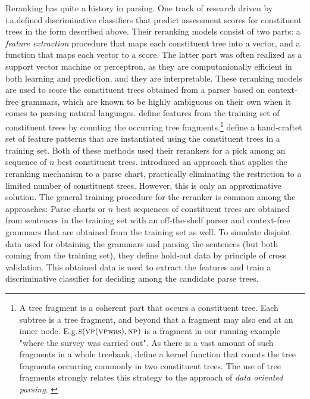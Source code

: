 \documentclass[../document.tex]{subfiles}
\begin{document}
    Reranking has quite a history in parsing.
    One track of research driven by \citet{collins2001convolution,shen2003svm,collins05,huang2008forest} i.a.\@ defined discriminative classifiers that predict assessment scores for constituent trees in the form described above.
    Their reranking models consist of two parts:
        a \emph{feature extraction} procedure that maps each constituent tree into a vector, and a function that maps each vector to a score.
    The latter part was often realized as a support vector machine or perceptron, as they are computanionally efficient in both learning and prediction, and they are interpretable.
    These reranking models are used to score the constituent trees obtained from a parser based on context-free grammars, which are known to be highly ambiguous on their own when it comes to parsing natural languages.
    \citet{collins2001convolution, shen2003svm} define features from the training set of constituent trees by counting the occurring tree fragments.\footnote{
        A tree fragment is a coherent part that occurs a constituent tree.
        Each subtree is a tree fragment, and beyond that a fragment may also end at an inner node.
        E.g.\@ \(\textsc{s} (\textsc{vp} (\textsc{vp} \text{was}), \textsc{np})\) is a fragment in our running example "where the survey was carried out".
        As there is a vast amount of such fragments in a whole treebank, \citet{collins2001convolution} define a kernel function that counts the tree fragments occurring commonly in two constituent trees.
        The use of tree fragments strongly relates this strategy to the approach of \emph{data oriented parsing}. \citep{Bod02}
    }
    \citet{collins05,charniak2005coarse} define a hand-craftet set of feature patterns that are instantiated using the constituent trees in a training set.
    Both of these methods used their rerankers for a pick among an sequence of \(n\) best constituent trees.
    \citet{huang2008forest} introduced an approach that applies the reranking mechanism to a parse chart, practically eliminating the restriction to a limited number of constituent trees.
    However, this is only an approximative solution.
    The general training procedure for the reranker is common among the approaches:
        Parse charts or \(n\) best sequences of constituent trees are obtained from sentences in the training set with an off-the-shelf parser and context-free grammars that are obtained from the training set as well.
        To simulate disjoint data used for obtaining the grammars and parsing the sentences (but both coming from the training set), they define hold-out data by principle of cross validation.
        This obtained data is used to extract the features and train a discriminative classifier for deciding among the candidate parse trees.
        
\end{document}
